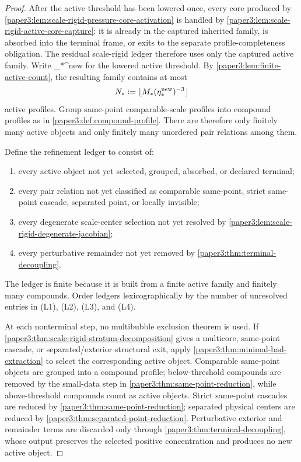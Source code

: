 \documentclass[11pt]{amsart}
\def\({}%
\def\){}%
\theoremstyle{plain}
\theoremstyle{definition}
\theoremstyle{remark}
\begin{document}
\begin{proof}
After the active threshold has been lowered once, every core produced by
\cref{paper3:lem:scale-rigid-pressure-core-activation} is handled by
\cref{paper3:lem:scale-rigid-active-core-capture}: it is already in the
captured inherited family, is absorbed into the terminal frame, or exits to the
separate profile-completeness obligation.  The residual scale-rigid ledger
therefore uses only the captured active family.  Write
\(\eta_*^{\rm new}\) for the lowered active threshold.  By
\cref{paper3:lem:finite-active-count}, the resulting family contains at most
\[
  N_*:=\lfloor M_*(\eta_*^{\rm new})^{-3}\rfloor
\]
active profiles.  Group same-point comparable-scale profiles into compound
profiles as in \cref{paper3:def:compound-profile}.  There are therefore only
finitely many active objects and only finitely many unordered pair relations
among them.

Define the refinement ledger to consist of:
\begin{enumerate}[label=\textup{(L\arabic*)}]
\item every active object not yet selected, grouped, absorbed, or declared
      terminal;
\item every pair relation not yet classified as comparable same-point, strict
      same-point cascade, separated point, or locally invisible;
\item every degenerate scale-center selection not yet resolved by
      \cref{paper3:lem:scale-rigid-degenerate-jacobian};
\item every perturbative remainder not yet removed by
      \cref{paper3:thm:terminal-decoupling}.
\end{enumerate}
The ledger is finite because it is built from a finite active family and
finitely many compounds.  Order ledgers lexicographically by the number of
unresolved entries in \textup{(L1)}, \textup{(L2)}, \textup{(L3)}, and
\textup{(L4)}.

At each nonterminal step, no multibubble exclusion theorem is used.  If
\cref{paper3:thm:scale-rigid-stratum-decomposition} gives a multicore,
same-point cascade, or separated/exterior structural exit, apply
\cref{paper3:thm:minimal-bad-extraction} to select the corresponding active
object.  Comparable same-point objects are grouped into a compound profile;
below-threshold compounds are removed by the small-data step in
\cref{paper3:thm:same-point-reduction}, while above-threshold compounds count
as active objects.  Strict same-point cascades are reduced by
\cref{paper3:thm:same-point-reduction}; separated physical centers are reduced
by \cref{paper3:thm:separated-point-reduction}.  Perturbative exterior and
remainder terms are discarded only through
\cref{paper3:thm:terminal-decoupling}, whose output preserves the selected
positive concentration and produces no new active object.


\end{proof}
\end{document}
